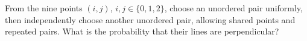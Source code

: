 From the nine points $(i,j)$, $i,j\in\{0,1,2\}$, choose an unordered pair uniformly, then independently choose another unordered pair, allowing shared points and repeated pairs. What is the probability that their lines are perpendicular?
